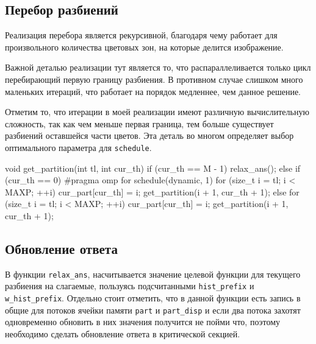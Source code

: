 \documentclass[14pt, russian, onesize]{extreport}
\begin{document}
\subsection*{Перебор разбиений} \label{implementation}
Реализация перебора является рекурсивной, благодаря чему работает для 
произвольного количества цветовых зон, на которые делится изображение.

Важной деталью реализации тут является то, что распараллеливается только цикл
перебирающий первую границу разбиения. 
В противном случае слишком много маленьких итераций, что работает на порядок 
медленнее, чем данное решение. 

Отметим то, что итерации в моей реализации имеют
различную вычислительную сложность, так как чем меньше первая граница,
тем больше существует разбиений оставшейся части цветов. Эта деталь во многом
определяет выбор оптимального параметра для \texttt{schedule}.

\begin{cppcode}
void get_partition(int tl, int cur_th) {
    if (cur_th == M - 1) {
        relax_ans();
    } else if (cur_th == 0) {
#pragma omp for schedule(dynamic, 1)
        for (size_t i = tl; i < MAXP; ++i) {
            cur_part[cur_th] = i;
            get_partition(i + 1, cur_th + 1);
        }
    } else {
        for (size_t i = tl; i < MAXP; ++i) {
            cur_part[cur_th] = i;
            get_partition(i + 1, cur_th + 1);
        }
    }
}
\end{cppcode}
\subsection*{Обновление ответа}
В функции \texttt{relax\_ans}, насчитывается значение целевой функции для
текущего разбиения на слагаемые, пользуясь подсчитанными 
\texttt{hist\_prefix} и \texttt{w\_hist\_prefix}. Отдельно стоит отметить,
что в данной функции есть запись в общие для потоков ячейки памяти 
\texttt{part} и \texttt{part\_disp} и если два потока захотят одновременно
обновить в них значения получится не пойми что, поэтому необходимо сделать обновление 
ответа в критической секцией.
\end{document}
